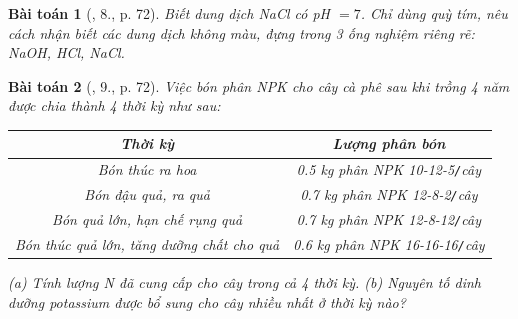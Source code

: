 \documentclass{article}
\newtheorem{baitoan}{Bài toán}
\begin{document}
\begin{baitoan}[\cite{SGK_KHTN_8_Canh_Dieu}, 8., p. 72]
	Biết dung dịch \emph{NaCl} có \emph{pH $= 7$}. Chỉ dùng quỳ tím, nêu cách nhận biết các dung dịch không màu, đựng trong 3 ống nghiệm riêng rẽ: \emph{NaOH, HCl, NaCl}.
\end{baitoan}

\begin{baitoan}[\cite{SGK_KHTN_8_Canh_Dieu}, 9., p. 72]
	Việc bón phân NPK cho cây cà phê sau khi trồng 4 năm được chia thành 4 thời kỳ như sau:
	\begin{table}[H]
		\centering
		\begin{tabular}{|c|c|}
			\hline
			Thời kỳ & Lượng phân bón \\
			\hline
			Bón thúc ra hoa & 0.5 kg phân NPK 10-12-5\texttt{/}cây \\
			\hline
			Bón đậu quả, ra quả & 0.7 kg phân NPK 12-8-2\texttt{/}cây \\
			\hline
			Bón quả lớn, hạn chế rụng quả & 0.7 kg phân NPK 12-8-12\texttt{/}cây \\
			\hline
			Bón thúc quả lớn, tăng dưỡng chất cho quả & 0.6 kg phân NPK 16-16-16\texttt{/}cây \\
			\hline
		\end{tabular}
	\end{table}
	\noindent(a) Tính lượng \emph{N} đã cung cấp cho cây trong cả 4 thời kỳ. (b) Nguyên tố dinh dưỡng potassium được bổ sung cho cây nhiều nhất ở thời kỳ nào?
\end{baitoan}


\printbibliography[heading=bibintoc]
	
\end{document}
